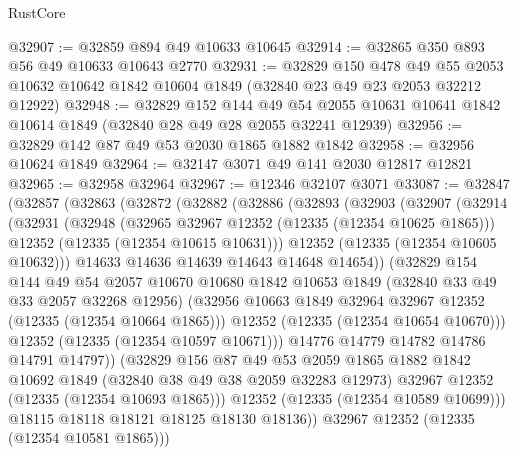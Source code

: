\begin{lexlean}{RustCore}
\begin{coremodule}
@32907 := @32859 @894 @49 @10633 @10645
@32914 := @32865 @350 @893 @56 @49 @10633 @10643 @2770
@32931 := @32829
    @150
    @478
    @49
    @55
    @2053
    @10632
    @10642
    @1842
    @10604
    @1849
    (@32840 @23 @49 @23 @2053 @32212 @12922)
@32948 := @32829
    @152
    @144
    @49
    @54
    @2055
    @10631
    @10641
    @1842
    @10614
    @1849
    (@32840 @28 @49 @28 @2055 @32241 @12939)
@32956 := @32829 @142 @87 @49 @53 @2030 @1865 @1882 @1842
@32958 := @32956 @10624 @1849
@32964 := @32147 @3071 @49 @141 @2030 @12817 @12821
@32965 := @32958 @32964
@32967 := @12346 @32107 @3071
@33087 := @32847
    (@32857
      (@32863
        (@32872
          (@32882
            (@32886
              (@32893
                (@32903
                  (@32907
                    (@32914
                      (@32931
                        (@32948
                          (@32965 @32967 @12352 (@12335 (@12354 @10625 @1865)))
                          @12352
                          (@12335 (@12354 @10615 @10631)))
                        @12352
                        (@12335 (@12354 @10605 @10632)))
                      @14633
                      @14636
                      @14639
                      @14643
                      @14648
                      @14654))
                  (@32829
                    @154
                    @144
                    @49
                    @54
                    @2057
                    @10670
                    @10680
                    @1842
                    @10653
                    @1849
                    (@32840 @33 @49 @33 @2057 @32268 @12956)
                    (@32956 @10663 @1849 @32964 @32967 @12352 (@12335 (@12354 @10664 @1865)))
                    @12352
                    (@12335 (@12354 @10654 @10670)))
                  @12352
                  (@12335 (@12354 @10597 @10671)))
                @14776
                @14779
                @14782
                @14786
                @14791
                @14797))
            (@32829
              @156
              @87
              @49
              @53
              @2059
              @1865
              @1882
              @1842
              @10692
              @1849
              (@32840 @38 @49 @38 @2059 @32283 @12973)
              @32967
              @12352
              (@12335 (@12354 @10693 @1865)))
            @12352
            (@12335 (@12354 @10589 @10699)))
          @18115
          @18118
          @18121
          @18125
          @18130
          @18136))
      @32967
      @12352
      (@12335 (@12354 @10581 @1865)))

\end{coremodule}
\end{lexlean}
